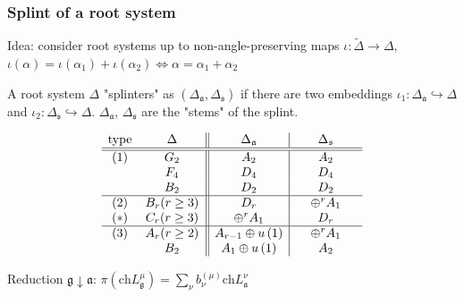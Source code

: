 \documentclass[pdftex]{beamer}
\newcommand{\gf}{\mathfrak{g}}
\newcommand{\af}{\mathfrak{a}}
\newcommand{\sfr}{\mathfrak{s}}
\theoremstyle{definition} \newtheorem{Def}{Definition}
\begin{document}
\begin{frame}
  \frametitle{Splint of a root system}
  Idea: consider root systems up to non-angle-preserving maps $\iota:\tilde\Delta\to \Delta$, $\iota(\alpha)=\iota(\alpha_{1})+\iota(\alpha_{2})\Leftrightarrow \alpha=\alpha_{1}+\alpha_{2}$

    A root system $\Delta$ "splinters"{ }as $\left(\Delta_{\af},\Delta_{\sfr}\right)$ if there are two embeddings $\iota_1:\Delta_{\af}\hookrightarrow\Delta$ and $\iota_2:\Delta_{\sfr}\hookrightarrow\Delta$.      $\Delta_{\af}$, $\Delta_{\sfr}$ are the "stems"{ }of the splint.


    \begin{equation*}
      \begin{array}{cc||c|c}
        \hbox{type} & \hspace{0.25in}\Delta \hspace{0.25in} & \hspace{0.25in}\Delta
        _{\frak{a}}\hspace{0.25in} & \hspace{0.25in}\Delta _{\frak{s}}\hspace{0.25in}
        \\ \hline\hline
        \hbox{(1)} & G_{2} & A_{2} & A_{2} \\
        & F_{4} & D_{4} & D_{4} \\ 
        & B_{2} & D_{2} & D_{2} \\ \hline
        \hbox{(2)} & B_{r}(r\geq 3) & D_{r} & \oplus ^{r}A_{1} \\
        (*)& C_{r}(r\geq 3) & \oplus ^{r}A_{1} &  D_{r} \\ \hline
        \hbox{(3)} & A_{r}(r\geq 2) & A_{r-1}\oplus u\left( 1\right)  & \oplus
        ^{r}A_{1} \\
        & B_{2} & A_{1}\oplus u\left( 1\right)  & A_{2}
      \end{array}
  \label{tb2}
    \end{equation*}

    Reduction $\gf\downarrow \af$: \quad$\pi\left(\mathrm{ch}L^{\mu}_{\gf}\right)=\sum_{\nu} b^{(\mu)}_{\nu} \mathrm{ch}L^{\nu}_{\af}$
\end{frame}
\end{document}
